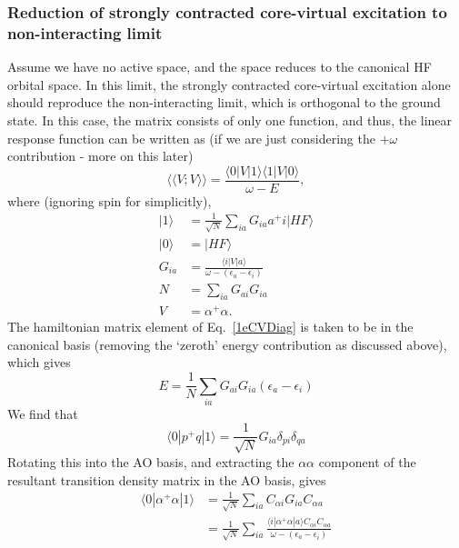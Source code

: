 \documentclass[a4paper,oneside,11pt]{article}
\numberwithin{equation}{section}
\begin{document}
\subsubsection{Reduction of strongly contracted core-virtual excitation to non-interacting limit}
\label{sec:ReductionofCV}
Assume we have no active space, and the space reduces to the canonical HF orbital space. In this limit, the strongly contracted core-virtual excitation
alone should reproduce the non-interacting limit, which is orthogonal to the ground state. In this case, the matrix consists of only one function, and thus, the linear response function can be
written as (if we are just considering the $+\omega$ contribution - more on this later)
\begin{equation}
\langle \langle V ; V \rangle \rangle = \frac{\langle 0 | V | 1 \rangle \langle 1 | V | 0 \rangle}{\omega - E}  ,   \label{CVLR}
\end{equation}
where (ignoring spin for simplicitly),
\begin{align}
|1 \rangle &= \frac{1}{\sqrt{N}} \sum_{ia} G_{ia} a^{+} i | HF \rangle  \\
|0 \rangle &= |HF \rangle   \\
G_{ia} &= \frac{ \langle i | V | a \rangle }{\omega-(\epsilon_a - \epsilon_i)}   \\ 
N &= \sum_{ia} G_{ai} G_{ia} \\
V &= \alpha^{+} \alpha  .
\end{align}
The hamiltonian matrix element of Eq.~\ref{1eCVDiag} is taken to be in the canonical basis (removing the `zeroth' energy contribution as discussed above), which gives
\begin{equation}
E = \frac{1}{N} \sum_{ia} G_{ai} G_{ia} (\epsilon_a - \epsilon_i)
\end{equation}
We find that
\begin{equation}
\langle 0 | p^{+} q | 1 \rangle = \frac{1}{\sqrt{N}} G_{ia} \delta_{pi} \delta_{qa}
\end{equation}
Rotating this into the AO basis, and extracting the $\alpha \alpha$ component of the resultant transition density matrix in the AO basis, gives
\begin{align}
\langle 0 | \alpha^{+} \alpha | 1 \rangle &= \frac{1}{\sqrt{N}} \sum_{ia} C_{\alpha i} G_{ia} C_{\alpha a}     \\
&= \frac{1}{\sqrt{N}} \sum_{ia} \frac{\langle i | \alpha^{+} \alpha | a \rangle C_{\alpha i} C_{\alpha a}}{\omega - (\epsilon_a - \epsilon_i)}
\end{align}
\end{document}
